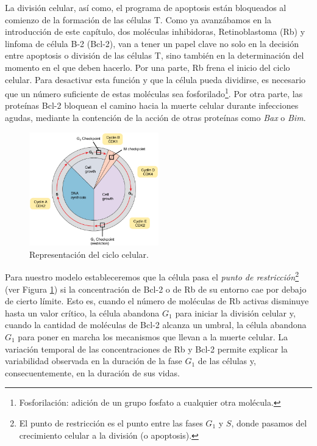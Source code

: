 La división celular, así como, el programa de apoptosis están bloqueados al comienzo de la formación de las células T. Como ya avanzábamos en la introducción de este capítulo, dos moléculas inhibidoras, Retinoblastoma (Rb) y linfoma de célula B-2 (Bcl-2), van a tener un papel clave no solo en la decisión entre apoptosis o división de las células T, sino también en la determinación del momento en el que deben hacerlo. Por una parte, Rb frena el inicio del ciclo celular. Para desactivar esta función y que la célula pueda dividirse, es necesario que un número suficiente de estas moléculas sea fosforilado\footnote{Fosforilación: adición de un grupo fosfato a cualquier otra molécula.}.  Por otra parte, las proteínas Bcl-2 bloquean el camino hacia la muerte celular durante infecciones agudas, mediante la contención de la acción de otras proteínas como \textit{Bax} o \textit{Bim}.


\begin{figure}[t]
	\centering
	\includegraphics[width=0.5\textwidth]{Cell_Cycle}
	\caption{Representación del ciclo celular.}
	\label{fig:ciclo celular}
\end{figure}

Para nuestro modelo estableceremos que la célula pasa el \textit{punto de restricción}\footnote{El punto de restricción es el punto entre las fases $G_{1}$ y $S$, donde pasamos del crecimiento celular a la división (o apoptosis).} (ver Figura \ref{fig:ciclo celular}) si la concentración de Bcl-2 o de Rb de su entorno cae por debajo de cierto límite. Esto es, cuando el número de moléculas de Rb activas disminuye hasta un valor crítico, la célula abandona $G_1$ para iniciar la división celular y, cuando la cantidad de moléculas de Bcl-2 alcanza un umbral, la célula abandona $G_1$ para poner en marcha los mecanismos que llevan a la muerte celular. La variación temporal  de las concentraciones de Rb y Bcl-2 permite explicar la variabilidad observada en la duración de la fase $G_{1}$ de las células y, consecuentemente, en la duración de sus vidas.

